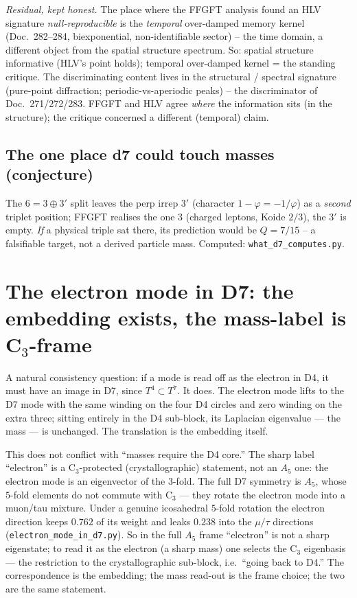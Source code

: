 \noindent\emph{Residual, kept honest.} The place where the FFGFT analysis found an HLV
signature \emph{null-reproducible} is the \emph{temporal} over-damped memory kernel
(Doc.~282--284, biexponential, non-identifiable sector) -- the time domain, a different object
from the spatial structure spectrum. So: spatial structure informative (HLV's point holds);
temporal over-damped kernel = the standing critique. The discriminating content lives in the
structural / spectral signature (pure-point diffraction; periodic-vs-aperiodic peaks) -- the
discriminator of Doc.~271/272/283. FFGFT and HLV agree \emph{where} the information sits (in
the structure); the critique concerned a different (temporal) claim.

\subsection{The one place d7 could touch masses (conjecture)}
The $6=3\oplus3'$ split leaves the perp irrep $3'$ (character $1-\varphi=-1/\varphi$) as a
\emph{second} triplet position; FFGFT realises the one $3$ (charged leptons, Koide $2/3$), the
$3'$ is empty. \emph{If} a physical triple sat there, its prediction would be $Q=7/15$ -- a
falsifiable target, not a derived particle mass. Computed: \texttt{what\_d7\_computes.py}.

\section{The electron mode in D7: the embedding exists, the mass-label is C$_3$-frame}
A natural consistency question: if a mode is read off as the electron in D4, it must have an
image in D7, since $T^4\subset T^7$. It does. The electron mode lifts to the D7 mode with the
same winding on the four D4 circles and zero winding on the extra three; sitting entirely in
the D4 sub-block, its Laplacian eigenvalue --- the mass --- is unchanged. The translation is
the embedding itself.

This does not conflict with \enquote{masses require the D4 core.} The sharp label
\enquote{electron} is a C$_3$-protected (crystallographic) statement, not an $A_5$ one: the
electron mode is an eigenvector of the $3$-fold. The full D7 symmetry is $A_5$, whose $5$-fold
elements do not commute with C$_3$ --- they rotate the electron mode into a muon/tau mixture.
Under a genuine icosahedral $5$-fold rotation the electron direction keeps $0.762$ of its weight
and leaks $0.238$ into the $\mu/\tau$ directions (\texttt{electron\_mode\_in\_d7.py}). So in the
full $A_5$ frame \enquote{electron} is not a sharp eigenstate; to read it as the electron (a
sharp mass) one selects the C$_3$ eigenbasis --- the restriction to the crystallographic
sub-block, i.e.\ \enquote{going back to D4.} The correspondence is the embedding; the mass
read-out is the frame choice; the two are the same statement.

